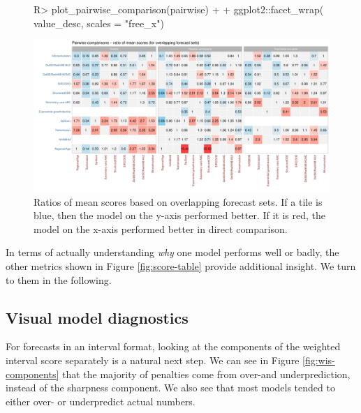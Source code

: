 \documentclass[article,shortnames]{jss}
\begin{document}
\begin{figure}[h!]
\centering
\begin{Schunk}
\begin{Sinput}
R> plot_pairwise_comparison(pairwise) +
+    ggplot2::facet_wrap(~ value_desc, scales = "free_x") 
\end{Sinput}
\end{Schunk}
\includegraphics{plots/plot-pairwise-plot}
\caption{\label{fig:pairwise-comparison} Ratios of mean scores based on overlapping forecast sets. If a tile is blue, then the model on the y-axis performed better. If it is red, the model on the x-axis performed better in direct comparison. }
\end{figure}

In terms of actually understanding \textit{why} one model performs well or badly, the other metrics shown in Figure \ref{fig:score-table} provide additional insight. We turn to them in the following. 

\subsection{Visual model diagnostics}

For forecasts in an interval format, looking at the components of the weighted interval score separately is a natural next step. We can see in Figure \ref{fig:wis-components} that the majority of penalties come from over-and underprediction, instead of the sharpness component. We also see that most models tended to either over- or underpredict actual numbers.  
\end{document}
